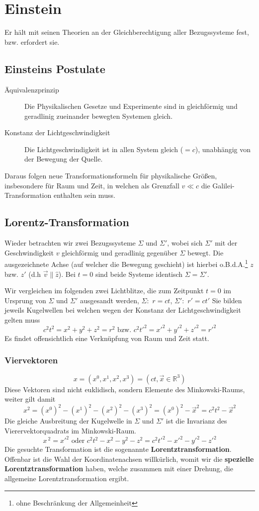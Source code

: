 \documentclass[oneside]{book}
\theoremstyle{definition}
\renewcommand{\Re}{\mathbb{R}}
\begin{document}
\section{Einstein}
Er hält mit seinen Theorien an der Gleichberechtigung aller Bezugssysteme fest, bzw. erfordert sie.

\subsection{Einsteins Postulate}
\begin{description}
	\item[Äquivalenzprinzip] Die Physikalischen Gesetze und Experimente sind in gleichförmig und geradlinig zueinander bewegten Systemen gleich.
	\item[Konstanz der Lichtgeschwindigkeit] Die Lichtgeschwindigkeit ist in allen System gleich ($=c$), unabhängig von der Bewegung der Quelle. 
\end{description}
Daraus folgen neue Transformationsformeln für physikalische Größen, insbesondere für Raum und Zeit, in welchen als Grenzfall $v \ll c$ die Galilei-Transformation enthalten sein muss.

\subsection{Lorentz-Transformation}
Wieder betrachten wir zwei Bezugssysteme $\Sigma$ und $\Sigma'$, wobei sich $\Sigma'$ mit der Geschwindigkeit $v$ gleichförmig und geradlinig gegenüber $\Sigma$ bewegt. Die ausgezeichnete Achse (auf welcher die Bewegung geschieht) ist hierbei o.B.d.A.\footnote{ohne Beschränkung der Allgemeinheit} $z$ bzw. $z'$ (d.h $\vec{v} \parallel \hat{z}$). Bei $t = 0$ sind beide Systeme identisch $\Sigma = \Sigma'$.

Wir vergleichen im folgenden zwei Lichtblitze, die zum Zeitpunkt $t=0$ im Ursprung von $\Sigma$ und $\Sigma'$ ausgesandt werden, $\Sigma:$ $r = ct$, $\Sigma':$ $r' = c t'$ Sie bilden jeweils Kugelwellen bei welchen wegen der Konstanz der Lichtgeschwindigkeit gelten muss 
$$c^2 t^2 = x^2 + y^2 + z^2 = r^2 \text{~bzw.~} c^2t'^2 = x'^2 + y'^2 + z'^2 = r'^2$$
Es findet offensichtlich eine Verknüpfung von Raum und Zeit statt.

\subsubsection{Viervektoren}
$$x = (x^0, x^1, x^2, x^3) = (ct, \vec{x}\in\Re^3)$$
Diese Vektoren sind nicht euklidisch, sondern Elemente des Minkowski-Raums, weiter gilt damit
$$x^2 = (x^0)^2 - (x^1)^2 - (x^2)^2 - (x^3)^2 = (x^0)^2 - \vec{x}^2 = c^2t^2 - \vec{x}^2$$
Die gleiche Ausbreitung der Kugelwelle in $\Sigma$ und $\Sigma'$ ist die Invarianz des Vierervektorquadrats im Minkowski-Raum.
$$x^{~2} = x'^2 \text{~oder~} c^2 t^2 - x^2 - y^2 - z^2 = c^2 t'^2 - x'^2 - y'^2 - z'^2$$
Die gesuchte Transformation ist die sogenannte \textbf{Lorentztransformation}. Offenbar ist die Wahl der Koordinatenachsen willkürlich, womit wir die \textbf{spezielle Lorentztransformation} haben, welche zusammen mit einer Drehung, die allgemeine Lorentztransformation ergibt.
\end{document}
